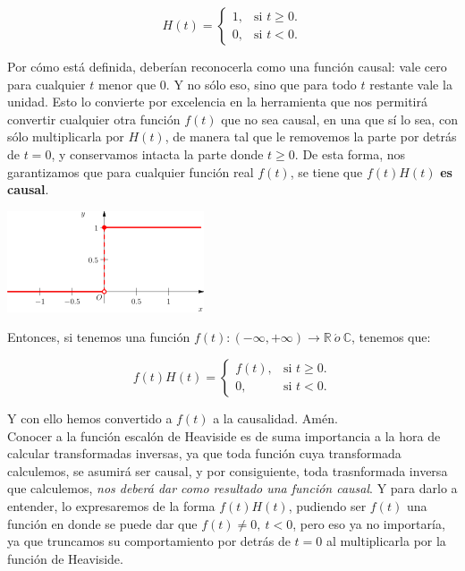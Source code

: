 \documentclass[12pt]{article}
\theoremstyle{definition}
\theoremstyle{theorem}
\theoremstyle{corolary}
\theoremstyle{method}
\begin{document}
\begin{equation*}
  H(t)=\begin{cases}
    1, & \text{si $t\geq 0$}.\\
    0, & \text{si $t<0$}.
  \end{cases}
\end{equation*}

Por c\'omo est\'a definida, deber\'ian reconocerla como una funci\'on causal: vale cero para cualquier $t$ menor que 0. Y no s\'olo eso, sino que para todo $t$ restante vale la unidad. Esto lo convierte por excelencia en la herramienta que nos permitir\'a convertir cualquier otra funci\'on $f(t)$ que no sea causal, en una que s\'i lo sea, con s\'olo multiplicarla por $H(t)$, de manera tal que le removemos la parte por detr\'as de $t=0$, y conservamos intacta la parte donde $t\geq 0$. De esta forma, nos garantizamos que para cualquier funci\'on real $f(t)$, se tiene que $f(t) H(t)$ \textbf{es causal}.

\begin{center}
	\includegraphics[scale=1]{HdeT.png}
\end{center}

Entonces, si tenemos una funci\'on $f(t):(-\infty, +\infty)\to \mathbb{R}\ \acute{o}\ \mathbb{C}$, tenemos que:

\begin{equation*}
  f(t)H(t)=\begin{cases}
    f(t), & \text{si $t\geq 0$}.\\
    0, & \text{si $t<0$}.
  \end{cases}
\end{equation*}

Y con ello hemos convertido a $f(t)$ a la causalidad. Am\'en.\\

Conocer a la funci\'on escal\'on de Heaviside es de suma importancia a la hora de calcular transformadas inversas, ya que toda funci\'on cuya transformada calculemos, se asumir\'a ser causal, y por consiguiente, toda trasnformada inversa que calculemos, \textit{nos deber\'a dar como resultado una funci\'on causal}. Y para darlo a entender, lo expresaremos de la forma $f(t)H(t)$, pudiendo ser $f(t)$ una funci\'on en donde se puede dar que $f(t)\neq 0,\ t<0$, pero eso ya no importar\'ia, ya que truncamos su comportamiento por detr\'as de $t=0$ al multiplicarla por la funci\'on de Heaviside.
\end{document}

